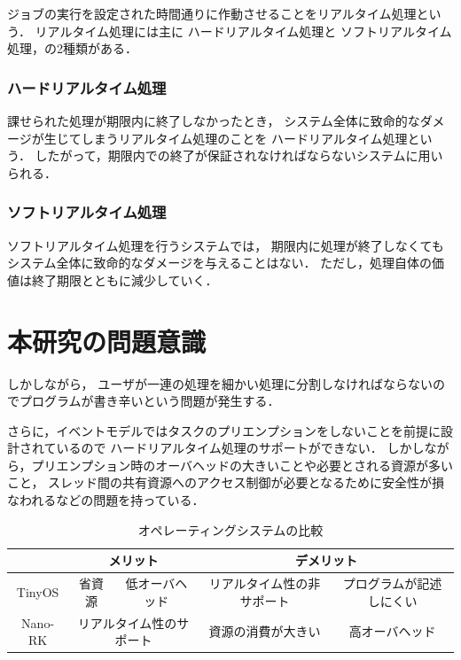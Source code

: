 ジョブの実行を設定された時間通りに作動させることをリアルタイム処理という．
リアルタイム処理には主に
ハードリアルタイム処理と
ソフトリアルタイム処理，の2種類がある．


\subsubsection{ハードリアルタイム処理}
課せられた処理が期限内に終了しなかったとき，
システム全体に致命的なダメージが生じてしまうリアルタイム処理のことを
ハードリアルタイム処理という．
したがって，期限内での終了が保証されなければならないシステムに用いられる．

\subsubsection{ソフトリアルタイム処理}
ソフトリアルタイム処理を行うシステムでは，
期限内に処理が終了しなくてもシステム全体に致命的なダメージを与えることはない．
ただし，処理自体の価値は終了期限とともに減少していく．


\section{本研究の問題意識}
しかしながら，
ユーザが一連の処理を細かい処理に分割しなければならないのでプログラムが書き辛いという問題が発生する．

さらに，イベントモデルではタスクのプリエンプションをしないことを前提に設計されているので
ハードリアルタイム処理のサポートができない．
しかしながら，プリエンプション時のオーバヘッドの大きいことや必要とされる資源が多いこと，
スレッド間の共有資源へのアクセス制御が必要となるために安全性が損なわれるなどの問題を持っている．

\begin{table}[htb]
  \centering
  \caption{オペレーティングシステムの比較}
  \begin{tabular}{|c||c|c|c|c|} \hline
    \backslashbox{}{} & \multicolumn{2}{|c|}{メリット} & \multicolumn{2}{|c|}{デメリット} \\ \hline \hline
    TinyOS & 省資源 & 低オーバヘッド & リアルタイム性の非サポート & プログラムが記述しにくい \\ \hline
    Nano-RK & \multicolumn{2}{|c|}{リアルタイム性のサポート} & 資源の消費が大きい & 高オーバヘッド \\ \hline
  \end{tabular}
  \label{tab:merit_and_demerit}
\end{table}


